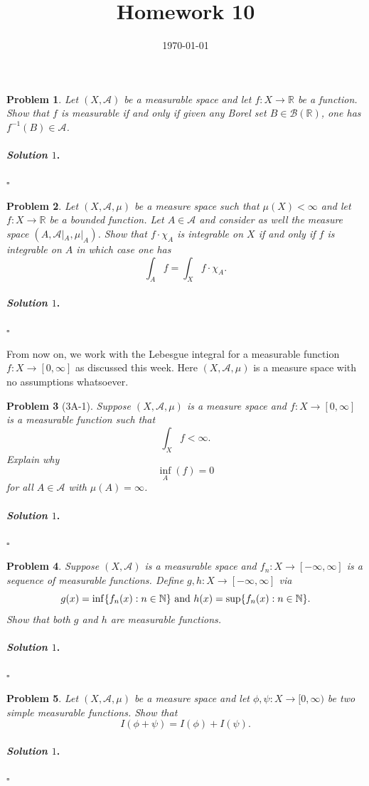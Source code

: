 \documentclass[reqno]{amsart}
\theoremstyle{plain}
\newtheorem{problem}{Problem}
\theoremstyle{definition}
\newenvironment{solution1}{\paragraph{\emph{Solution $1$}.}}{\hfill$\square$}
\begin{document}
 

\title[Homework 10]{Homework 10}

\date{\today} 
\maketitle 






\begin{problem}
Let $(X,\mathcal{A})$ be a measurable space and let $f: X \rightarrow \mathbb{R}$ be a function.  Show that $f$ is measurable if and only if given any Borel set $B \in \mathcal{B}(\mathbb{R})$, one has $f^{-1}(B) \in \mathcal{A}$.
\end{problem}
\begin{solution1}

\end{solution1}


\begin{problem}
Let $(X,\mathcal{A},\mu)$ be a measure space such that $\mu(X) < \infty$ and let $f: X \rightarrow \mathbb{R}$ be a bounded function.  Let $A \in \mathcal{A}$ and consider as well the measure space $(A,\mathcal{A}|_{A},\mu|_{A})$.  Show that $f \cdot \chi_{A}$ is integrable on $X$ if and only if $f$ is integrable on $A$ in which case one has
$$\int_{A}f = \int_{X} f \cdot \chi_{A}. $$
\end{problem}
\begin{solution1}

\end{solution1}

From now on, we work with the Lebesgue integral for a measurable function $f:X \rightarrow [0,\infty]$ as discussed this week.  Here $(X,\mathcal{A},\mu)$ is a measure space with no assumptions whatsoever.

\begin{problem}[3A-1]
Suppose $(X,\mathcal{A},\mu)$ is a measure space and $f:X \rightarrow [0,\infty]$ is a measurable function such that 
$$\int_{X} f < \infty. $$
Explain why
$$\inf_{A}(f) = 0 $$
for all $A \in \mathcal{A}$ with $\mu(A) = \infty$.
\end{problem}
\begin{solution1}

\end{solution1}

\begin{problem}
Suppose $(X,\mathcal{A})$ is a measurable space and $f_{n}:X \rightarrow [-\infty,\infty]$ is a sequence of measurable functions.  Define $g,h: X \rightarrow [-\infty,\infty]$ via
$$g(x) = {\rm inf}\{f_{n}(x): n \in \mathbb{N} \} \text{ and } h(x) = {\rm sup}\{f_{n}(x): n \in \mathbb{N} \}.$$
Show that both $g$ and $h$ are measurable functions.
\end{problem}
\begin{solution1}

\end{solution1}





\begin{problem}
Let $(X,\mathcal{A},\mu)$ be a measure space and let $\phi,\psi:X \rightarrow [0,\infty)$ be two simple measurable functions.  Show that 
$$I(\phi + \psi) = I(\phi) + I(\psi). $$ 
\end{problem}
\begin{solution1}

\end{solution1}
\end{document}
